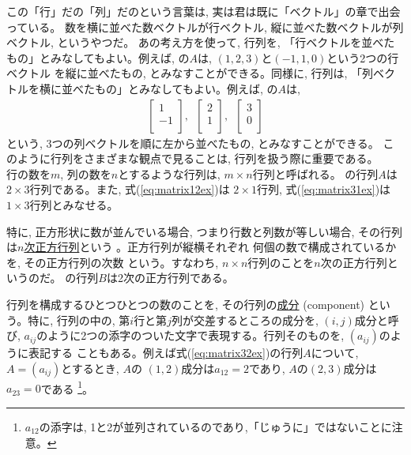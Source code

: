 この「行」だの「列」だのという言葉は, 実は君は既に「ベクトル」の章で出会っている。
数を横に並べた数ベクトルが行ベクトル, 縦に並べた数ベクトルが列ベクトル, というやつだ。
あの考え方を使って, 行列を, 「行ベクトルを並べたもの」とみなしてもよい。例えば, 
の$A$は, $(1, 2, 3)$と$(-1, 1, 0)$という2つの行ベクトル
を縦に並べたもの, とみなすことができる。同様に, 
行列は, 「列ベクトルを横に並べたもの」とみなしてもよい。例えば, の$A$は, 
\begin{eqnarray}
\begin{bmatrix}
1 \\
-1 \\
\end{bmatrix},\,\,\,
\begin{bmatrix}
2 \\
1 \\
\end{bmatrix},\,\,\,
\begin{bmatrix}
3 \\
0 \\
\end{bmatrix}
\end{eqnarray}
という, 3つの列ベクトルを順に左から並べたもの, とみなすことができる。
このように行列をさまざまな観点で見ることは, 行列を扱う際に重要である。\\

行の数を$m$, 列の数を$n$とするような行列は, $m\times n$行列と呼ばれる。
の行列$A$は$2\times3$行列である。また, 式(\ref{eq:matrix12ex})は
$2\times1$行列, 式(\ref{eq:matrix31ex})は$1\times3$行列とみなせる。

特に, 正方形状に数が並んでいる場合, つまり行数と列数が等しい場合, 
その行列は\underline{$n$次正方行列}という
。正方行列が縦横それぞれ
何個の数で構成されているかを, その正方行列の次数
という。すなわち, $n\times　n$行列のことを$n$次の正方行列というのだ。
の行列$B$は2次の正方行列である。

行列を構成するひとつひとつの数のことを, その行列の\underline{成分} (component)
という。特に, 行列の中の, 第$i$行と第$j$列が交差するところの成分を, $(i, j)$成分と呼び, 
$a_{ij}$のように2つの添字のついた文字で表現する。行列そのものを, $(a_{ij})$のように表記する
こともある。例えば式(\ref{eq:matrix32ex})の行列$A$について, $A=(a_{ij})$とするとき, $A$の
$(1,2)$成分は$a_{12}=2$であり, $A$の$(2, 3)$成分は$a_{23}=0$である
\footnote{$a_{12}$の添字は, 1と2が並列されているのであり,「じゅうに」ではないことに注意。}。

